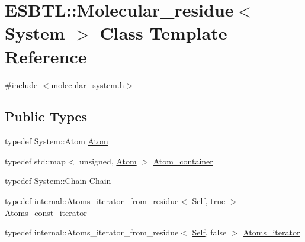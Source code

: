\hypertarget{classESBTL_1_1Molecular__residue}{}\section{E\+S\+B\+TL\+:\+:Molecular\+\_\+residue$<$ System $>$ Class Template Reference}
\label{classESBTL_1_1Molecular__residue}


{\ttfamily \#include $<$molecular\+\_\+system.\+h$>$}

\subsection*{Public Types}
\begin{DoxyCompactItemize}
\item 
typedef System\+::\+Atom \hyperlink{classESBTL_1_1Molecular__residue_ac48ca38f130266b0403df294bff016ae}{Atom}
\item 
typedef std\+::map$<$ unsigned, \hyperlink{classESBTL_1_1Molecular__residue_ac48ca38f130266b0403df294bff016ae}{Atom} $>$ \hyperlink{classESBTL_1_1Molecular__residue_af354df2c3267d075215464cd408b8d78}{Atom\+\_\+container}
\item 
typedef System\+::\+Chain \hyperlink{classESBTL_1_1Molecular__residue_a3e18b15e0505f8b1c0d0bf200091698d}{Chain}
\item 
typedef internal\+::\+Atoms\+\_\+iterator\+\_\+from\+\_\+residue$<$ \hyperlink{classESBTL_1_1Molecular__residue}{Self}, true $>$ \hyperlink{group__grp__iters_gab312d7a420670665b99a379b51825c9c}{Atoms\+\_\+const\+\_\+iterator}
\item 
typedef internal\+::\+Atoms\+\_\+iterator\+\_\+from\+\_\+residue$<$ \hyperlink{classESBTL_1_1Molecular__residue}{Self}, false $>$ \hyperlink{group__grp__iters_ga4f220ea2d647f555b579a7ab2831baa7}{Atoms\+\_\+iterator}
\end{DoxyCompactItemize}
